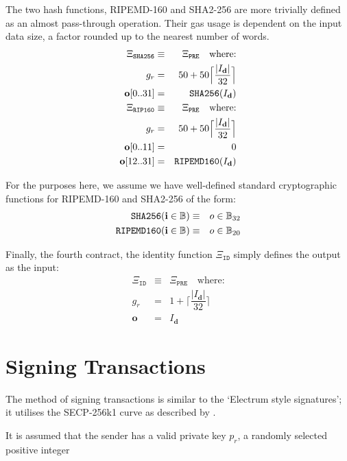 \documentclass[9pt,oneside]{amsart}
\begin{document}
The two hash functions, RIPEMD-160 and SHA2-256 are more trivially defined as an almost pass-through operation. Their gas usage is dependent on the input data size, a factor rounded up to the nearest number of words.
\begin{eqnarray}
\Xi_{\mathtt{SHA256}} &\equiv& \Xi_{\mathtt{PRE}} \quad \text{where:} \\
g_r &=& 50 + 50\Big\lceil \dfrac{|I_\mathbf{d}|}{32} \Big\rceil\\
\mathbf{o}[0..31] &=& \mathtt{\tiny SHA256}(I_\mathbf{d})\\
\Xi_{\mathtt{RIP160}} &\equiv& \Xi_{\mathtt{PRE}} \quad \text{where:} \\
g_r &=& 50 + 50\Big\lceil \dfrac{|I_\mathbf{d}|}{32} \Big\rceil\\
\mathbf{o}[0..11] &=& 0 \\
\mathbf{o}[12..31] &=& \mathtt{\tiny RIPEMD160}(I_\mathbf{d})\\
\end{eqnarray}

For the purposes here, we assume we have well-defined standard cryptographic functions for RIPEMD-160 and SHA2-256 of the form:
\begin{eqnarray}
\mathtt{\small SHA256}(\mathbf{i} \in \mathbb{B}) & \equiv & o \in \mathbb{B}_{32} \\
\mathtt{\small RIPEMD160}(\mathbf{i} \in \mathbb{B}) & \equiv & o \in \mathbb{B}_{20}
\end{eqnarray}

Finally, the fourth contract, the identity function $\Xi_{\mathtt{ID}}$ simply defines the output as the input:
\begin{eqnarray}
\Xi_{\mathtt{ID}} &\equiv& \Xi_{\mathtt{PRE}} \quad \text{where:} \\
g_r &=& 1 + \Big\lceil \dfrac{|I_\mathbf{d}|}{32} \Big\rceil\\
\mathbf{o} &=& I_\mathbf{d}
\end{eqnarray}


\section{Signing Transactions}\label{app:signing}

The method of signing transactions is similar to the `Electrum style signatures'; it utilises the SECP-256k1 curve as described by \cite{gura2004comparing}.

It is assumed that the sender has a valid private key $p_r$, a randomly selected positive integer
\end{document}
